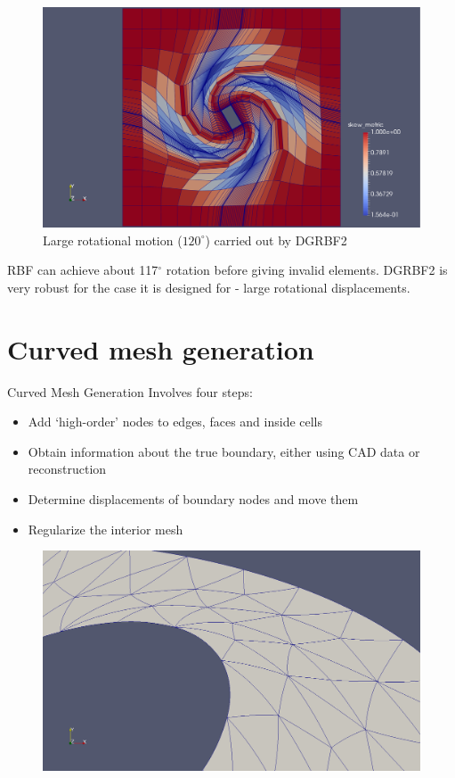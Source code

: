 \documentclass[t,12pt]{beamer}
\begin{document}
\begin{frame}
	\begin{figure}
		\centering
		\includegraphics[scale=0.2]{qin-120-quality-withmesh.pdf}
		\caption{Large rotational motion ($120^\circ$) carried out by DGRBF2}
		\label{fig:qin-dgrbf2-120}
	\end{figure}
	RBF can achieve about 117$^\circ$ rotation before giving invalid elements.
	DGRBF2 is very robust for the case it is designed for - large rotational displacements.
\end{frame}

\section{Curved mesh generation}

\begin{frame}{Curved Mesh Generation}
Involves four steps:
\begin{itemize}
	\item Add `high-order' nodes to edges, faces and inside cells
	\item Obtain information about the true boundary, either using CAD data or reconstruction
	\item Determine displacements of boundary nodes and move them
	\item Regularize the interior mesh
\end{itemize}
\begin{figure}
	\includegraphics[scale=0.1]{coarse-curved-mesh-zoomed1}
\end{figure}
\end{frame}
\end{document}
